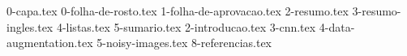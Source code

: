 \documentclass[12pt,nodisplayskipstretch]{article}
\begin{document}
{0-capa.tex}
{0-folha-de-rosto.tex}
{1-folha-de-aprovacao.tex}
{2-resumo.tex}
{3-resumo-ingles.tex}
{4-listas.tex}
{5-sumario.tex}
{2-introducao.tex}
{3-cnn.tex}
{4-data-augmentation.tex}
{5-noisy-images.tex}
{8-referencias.tex}
\end{document}
